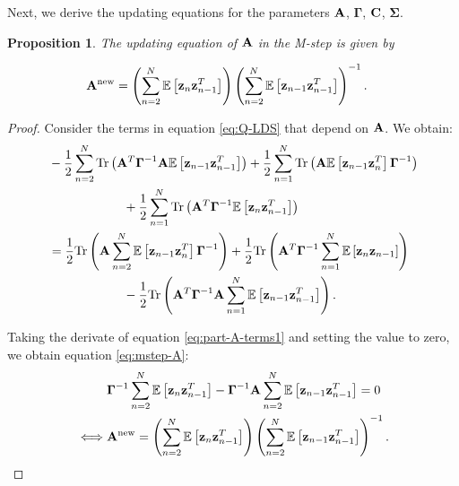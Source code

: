\documentclass[11pt]{article}
\numberwithin{equation}{section}
\newcommand{\expectation}[1]{\mathbb{E}\left[#1\right]}
\newcommand{\z}{{\bf z}}
\newtheorem{proposition}{Proposition}[section]
\begin{document}
Next, we derive the updating equations for the parameters $\bf A$, $\boldsymbol{\Gamma}$, $\bf C$, $\boldsymbol{\Sigma}$.

\begin{proposition}
	The updating equation of $\bf A$ in the M-step is given by
	
	\begin{align}
		{\bf A}^{\text{\normalfont new}} &= \left(\sum_{n=2}^N \expectation{\z_n \z_{n-1}^T}\right)\left(\sum_{n=2}^N \expectation{\z_{n-1}\z_{n-1}^T}\right)^{-1} \label{eq:mstep-A}.
	\end{align}
\end{proposition}

\begin{proof}
	Consider the terms in equation \eqref{eq:Q-LDS} that depend on $\bf A$. We obtain:
	\begin{align}
		& -\frac{1}{2}\sum_{n=2}^N \text{Tr}\left({\bf A}^T\boldsymbol{\Gamma}^{-1}{\bf A}\expectation{\z_{n-1}\z_{n-1}^T}\right) + \frac{1}{2}\sum_{n=1}^N\text{Tr}\left({\bf A}\expectation{\z_{n-1}\z_n^T}\boldsymbol{\Gamma}^{-1}\right) \nonumber\\
		&\hspace{2.1cm} + \frac{1}{2}\sum_{n=1}^N\text{Tr}\left({\bf A}^T \boldsymbol\Gamma^{-1} \expectation{\z_n\z_{n-1}^T}\right)\\
		&= \frac{1}{2}\text{Tr}\left({\bf A} \sum_{n=2}^N \expectation{\z_{n-1}\z_n^T} \boldsymbol\Gamma^{-1}\right) + \frac{1}{2}\text{Tr}\left({\bf A}^T\boldsymbol\Gamma^{-1} \sum_{n=1}^N\expectation{\z_n\z_{n-1}}\right) \nonumber\\
		&\hspace{2.1cm} - \frac{1}{2}\text{Tr}\left({\bf A}^T \boldsymbol\Gamma^{-1} {\bf A}\sum_{n=1}^N \expectation{\z_{n-1}\z_{n-1}^T}\right)\label{eq:part-A-terms1}.
	\end{align}
	
	Taking the derivate of equation \eqref{eq:part-A-terms1} and setting the value to zero, we obtain equation \eqref{eq:mstep-A}:
	\begin{align}
		&\boldsymbol{\Gamma}^{-1} \sum_{n=2}^N \expectation{\z_n\z_{n-1}^T} - \boldsymbol{\Gamma}^{-1} {\bf A} \sum_{n=2}^N\expectation{\z_{n-1}\z_{n-1}^T} = 0\\
		\iff& {\bf A}^{\text{new}} = \left(\sum_{n=2}^N \expectation{\z_n \z_{n-1}^T}\right)\left(\sum_{n=2}^N \expectation{\z_{n-1}\z_{n-1}^T}\right)^{-1}.
	\end{align}
\end{proof}
\end{document}
